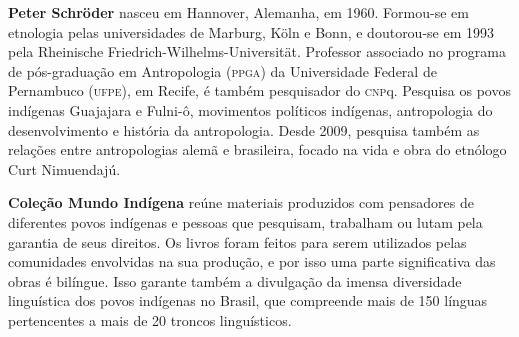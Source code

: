 \textbf{Peter Schröder} nasceu em Hannover, Alemanha, em 1960. Formou-se em etnologia pelas universidades de Marburg, Köln e Bonn, e doutorou-se em 1993 pela Rheinische Friedrich-Wilhelms-Universität. Professor associado no programa de pós-graduação em Antropologia (\textsc{ppga}) da Universidade Federal de Pernambuco (\textsc{ufpe}), em Recife, é também pesquisador do \textsc{cnp}q. Pesquisa os povos indígenas Guajajara e Fulni-ô, movimentos políticos indígenas, antropologia do desenvolvimento e história da antropologia. Desde 2009, pesquisa também as relações entre antropologias alemã e brasileira, focado na vida e obra do etnólogo Curt Nimuendajú.

\textbf{Coleção Mundo Indígena} reúne materiais produzidos com pensadores de diferentes povos indígenas e pessoas que pesquisam, trabalham ou lutam pela garantia de seus direitos. Os livros foram feitos para serem utilizados pelas comunidades envolvidas na sua produção, e por isso uma parte significativa das obras é bilíngue. Isso garante também a divulgação da imensa diversidade linguística dos povos indígenas no Brasil, que compreende mais de 150 línguas pertencentes a mais de 20 troncos linguísticos. 

